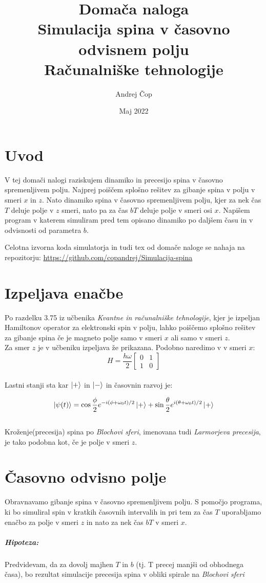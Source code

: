 \documentclass[12pt, a4paper]{article}
\title{  Domača naloga\\\large\textbf{Simulacija spina v časovno odvisnem polju}\\
\large Računalniške tehnologije}
\author{Andrej Čop}
\date{Maj 2022}
\begin{document}
\maketitle
\newpage

\tableofcontents
\newpage

\section{Uvod}
V tej domači nalogi raziskujem dinamiko in precesijo spina v časovno spremenljivem polju. Najprej poiščem splošno rešitev za gibanje spina v polju v smeri $x$ in $z$. Nato dinamiko spina v časovno spremenljivem polju, kjer za nek čas $T$ deluje polje v $z$ smeri, nato pa za čas $bT$ deluje polje v smeri osi $x$. Napišem program v katerem simuliram pred tem opisano dinamiko po daljšem času in v odvisnosti od parametra $b$.

Celotna izvorna koda simulatorja in tudi tex od domače naloge se nahaja na repozitorju: \url{https://github.com/copandrej/Simulacija-spina} 
\section{Izpeljava enačbe}
Po razdelku 3.75 iz učbenika \textit{Kvantne in računalniške tehnologije}, kjer je izpeljan Hamiltonov operator za elektronski spin v polju, lahko poiščemo splošno rešitev za gibanje spina če je magneto polje samo v smeri $x$ ali samo v smeri $z$.\\
Za smer $z$ je v učbeniku izpeljava že prikazana. Podobno naredimo v v smeri $x$:\\
\begin{equation}
H = \frac{h\omega}{2}
\begin{bmatrix}
0 & 1\\
1 & 0
\end{bmatrix}
\end{equation}\\
Lastni stanji sta kar $\ket{+}$ in $\ket{-}$ in časovnin razvoj je:


\begin{equation}
\ket{\psi(t)} = \cos\frac{\phi}{2}e^{-i(\phi+\omega_0 t)/2}\ket{+} + \sin\frac{\theta}{2}e^{i(\theta+\omega_0 t)/2}\ket{+}
\end{equation}\\
Kroženje(precesija) spina po \textit{Blochovi sferi}, imenovana tudi \textit{Larmorjeva precesija}, je tako podobna kot, če je polje v smeri $z$.

\section{Časovno odvisno polje}
Obravnavamo gibanje spina v časovno spremenljivem polju. S pomočjo programa, ki bo simuliral spin v kratkih časovnih intervalih in pri tem za čas $T$ uporabljamo enačbo za polje v smeri $z$ in nato za nek čas $bT$ v smeri $x$. 
\subparagraph{Hipoteza:}
Predvidevam, da za dovolj majhen $T$ in $b$ (tj. T precej manjši od obhodnega časa), bo rezultat simulacije precesija spina v obliki spirale na \textit{Blochovi sferi}
\end{document}

